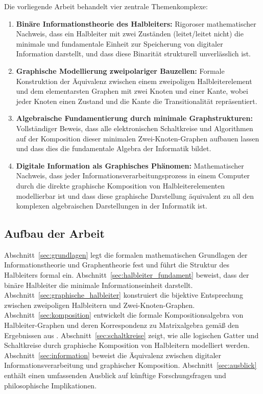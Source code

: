 \documentclass[12pt, a4paper]{article}
\theoremstyle{definition}
\theoremstyle{remark}
\begin{document}
Die vorliegende Arbeit behandelt vier zentrale Themenkomplexe:

\begin{enumerate}[label=(\roman*)]
  \item \textbf{Binäre Informationstheorie des Halbleiters:} Rigoroser mathematischer Nachweis, dass ein Halbleiter mit zwei Zuständen (leitet/leitet nicht) die minimale und fundamentale Einheit zur Speicherung von digitaler Information darstellt, und dass diese Binarität strukturell unverlässlich ist.

  \item \textbf{Graphische Modellierung zweipolariger Bauzellen:} Formale Konstruktion der Äquivalenz zwischen einem zweipoligen Halbleiterelement und dem elementarsten Graphen mit zwei Knoten und einer Kante, wobei jeder Knoten einen Zustand und die Kante die Transitionalität repräsentiert.

  \item \textbf{Algebraische Fundamentierung durch minimale Graphstrukturen:} Vollständiger Beweis, dass alle elektronischen Schaltkreise und Algorithmen auf der Komposition dieser minimalen Zwei-Knoten-Graphen aufbauen lassen und dass dies die fundamentale Algebra der Informatik bildet.

  \item \textbf{Digitale Information als Graphisches Phänomen:} Mathematischer Nachweis, dass jeder Informationsverarbeitungsprozess in einem Computer durch die direkte graphische Komposition von Halbleiterelementen modellierbar ist und dass diese graphische Darstellung äquivalent zu all den komplexen algebraischen Darstellungen in der Informatik ist.
\end{enumerate}

\subsection{Aufbau der Arbeit}
\label{subsec:aufbau}

Abschnitt~\ref{sec:grundlagen} legt die formalen mathematischen Grundlagen der Informationstheorie und Graphentheorie fest und führt die Struktur des Halbleiters formal ein. Abschnitt~\ref{sec:halbleiter_fundament} beweist, dass der binäre Halbleiter die minimale Informationseinheit darstellt. Abschnitt~\ref{sec:graphische_halbleiter} konstruiert die bijektive Entsprechung zwischen zweipoligen Halbleitern und Zwei-Knoten-Graphen. Abschnitt~\ref{sec:komposition} entwickelt die formale Kompositionsalgebra von Halbleiter-Graphen und deren Korrespondenz zu Matrixalgebra gemäß den Ergebnissen aus \cite{epp2026matrgraph}. Abschnitt~\ref{sec:schaltkreise} zeigt, wie alle logischen Gatter und Schaltkreise durch graphische Komposition von Halbleitern modelliert werden. Abschnitt~\ref{sec:information} beweist die Äquivalenz zwischen digitaler Informationsverarbeitung und graphischer Komposition. Abschnitt~\ref{sec:ausblick} enthält einen umfassenden Ausblick auf künftige Forschungsfragen und philosophische Implikationen.
\end{document}
